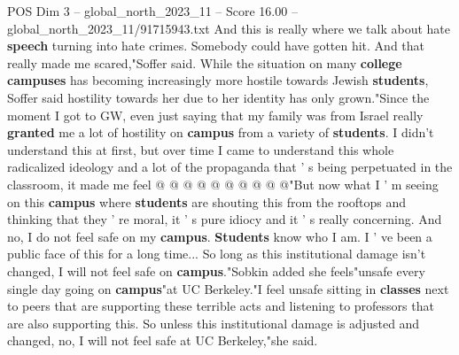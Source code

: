 \begin{textsample}{POS Dim 3 – global\_north\_2023\_11 – Score 16.00 – global\_north\_2023\_11/91715943.txt}
And this is really where we talk about hate \textbf{speech} turning into hate crimes.
Somebody could have gotten hit.
And that really made me scared,"Soffer said.
While the situation on many \textbf{college} \textbf{campuses} has becoming increasingly more hostile towards Jewish \textbf{students}, Soffer said hostility towards her due to her identity has only grown."Since the moment I got to GW, even just saying that my family was from Israel really \textbf{granted} me a lot of hostility on \textbf{campus} from a variety of \textbf{students}.
I didn't understand this at first, but over time I came to understand this whole radicalized ideology and a lot of the propaganda that ' s being perpetuated in the classroom, it made me feel @ @ @ @ @ @ @ @ @ @"But now what I ' m seeing on this \textbf{campus} where \textbf{students} are shouting this from the rooftops and thinking that they ' re moral, it ' s pure idiocy and it ' s really concerning.
And no, I do not feel safe on my \textbf{campus}. \textbf{Students} know who I am.
I ' ve been a public face of this for a long time...
So long as this institutional damage isn't changed, I will not feel safe on \textbf{campus}."Sobkin added she feels"unsafe every single day going on \textbf{campus}"at UC Berkeley."I feel unsafe sitting in \textbf{classes} next to peers that are supporting these terrible acts and listening to professors that are also supporting this.
So unless this institutional damage is adjusted and changed, no, I will not feel safe at UC Berkeley,"she said.

\end{textsample}
